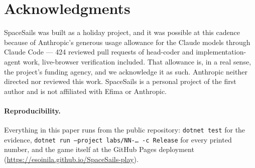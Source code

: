 \documentclass[10pt,twocolumn]{article}
\begin{document}
\section*{Acknowledgments}

SpaceSails was built as a holiday project, and it was possible at this cadence because of
Anthropic's generous usage allowance for the Claude models through Claude Code --- 424
reviewed pull requests of head-coder and implementation-agent work, live-browser
verification included. That
allowance is, in a real sense, the project's funding agency, and we acknowledge it as
such. Anthropic neither directed nor reviewed this work. SpaceSails is a personal project
of the first author and is not affiliated with Efima or Anthropic.

\paragraph{Reproducibility.}
Everything in this paper runs from the public repository: \texttt{dotnet test} for the
evidence, \texttt{dotnet run --project labs/NN-\ldots\ -c Release} for every printed
number, and the game itself at the GitHub Pages deployment
(\url{https://esoinila.github.io/SpaceSails-play}).
\end{document}

